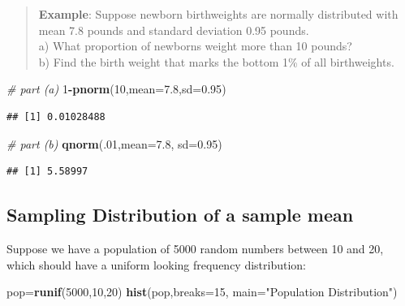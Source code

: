 \documentclass[
]{book}
\newenvironment{Shaded}{\begin{snugshade}}{\end{snugshade}}
\newcommand{\AttributeTok}[1]{\textcolor[rgb]{0.13,0.29,0.53}{#1}}
\newcommand{\CommentTok}[1]{\textcolor[rgb]{0.56,0.35,0.01}{\textit{#1}}}
\newcommand{\DecValTok}[1]{\textcolor[rgb]{0.00,0.00,0.81}{#1}}
\newcommand{\FloatTok}[1]{\textcolor[rgb]{0.00,0.00,0.81}{#1}}
\newcommand{\FunctionTok}[1]{\textcolor[rgb]{0.13,0.29,0.53}{\textbf{#1}}}
\newcommand{\NormalTok}[1]{#1}
\newcommand{\OtherTok}[1]{\textcolor[rgb]{0.56,0.35,0.01}{#1}}
\newcommand{\SpecialCharTok}[1]{\textcolor[rgb]{0.81,0.36,0.00}{\textbf{#1}}}
\newcommand{\StringTok}[1]{\textcolor[rgb]{0.31,0.60,0.02}{#1}}
\theoremstyle{definition}
\theoremstyle{definition}
\theoremstyle{definition}
\theoremstyle{definition}
\theoremstyle{remark}
\begin{document}
\begin{quote}
\textbf{Example}: Suppose newborn birthweights are normally distributed with mean 7.8 pounds and standard deviation 0.95 pounds.\\
a) What proportion of newborns weight more than 10 pounds?\\
b) Find the birth weight that marks the bottom 1\% of all birthweights.
\end{quote}

\begin{Shaded}
\begin{Highlighting}[]
\CommentTok{\# part (a)}
\DecValTok{1}\SpecialCharTok{{-}}\FunctionTok{pnorm}\NormalTok{(}\DecValTok{10}\NormalTok{,}\AttributeTok{mean=}\FloatTok{7.8}\NormalTok{,}\AttributeTok{sd=}\FloatTok{0.95}\NormalTok{)}
\end{Highlighting}
\end{Shaded}

\begin{verbatim}
## [1] 0.01028488
\end{verbatim}

\begin{Shaded}
\begin{Highlighting}[]
\CommentTok{\# part (b)}
\FunctionTok{qnorm}\NormalTok{(.}\DecValTok{01}\NormalTok{,}\AttributeTok{mean=}\FloatTok{7.8}\NormalTok{, }\AttributeTok{sd=}\FloatTok{0.95}\NormalTok{)}
\end{Highlighting}
\end{Shaded}

\begin{verbatim}
## [1] 5.58997
\end{verbatim}

\subsection{Sampling Distribution of a sample mean}\label{sampling-distribution-of-a-sample-mean}

Suppose we have a population of 5000 random numbers between 10 and 20, which should have a uniform looking frequency distribution:

\begin{Shaded}
\begin{Highlighting}[]
\NormalTok{pop}\OtherTok{=}\FunctionTok{runif}\NormalTok{(}\DecValTok{5000}\NormalTok{,}\DecValTok{10}\NormalTok{,}\DecValTok{20}\NormalTok{)}
\FunctionTok{hist}\NormalTok{(pop,}\AttributeTok{breaks=}\DecValTok{15}\NormalTok{, }\AttributeTok{main=}\StringTok{"Population Distribution"}\NormalTok{)}
\end{Highlighting}
\end{Shaded}
\end{document}

